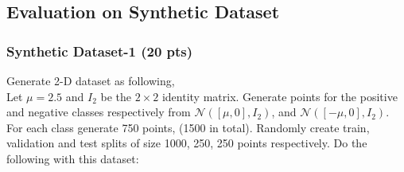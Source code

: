 \documentclass[a4paper]{article}
\theoremstyle{definition}
\begin{document}
 \subsection{Evaluation on Synthetic Dataset}
 \subsubsection{Synthetic Dataset-1 (20 pts)}
 Generate 2-D dataset as following, \\
 Let $\mu=2.5$ and $I_2$ be the $2\times2$ identity matrix. Generate points for the positive and negative classes respectively from $\mathcal{N}([\mu,0],I_2)$, and $\mathcal{N}([-\mu,0],I_2)$. For each class generate 750 points, (1500 in total). Randomly create train, validation and test splits of size 1000, 250, 250 points respectively. Do the following with this dataset:
\end{document}
